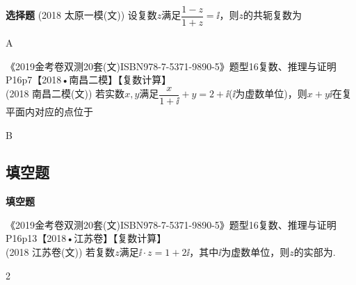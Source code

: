 \begin{exercise}{\bf 选择题}
        {\kaishu (2018 \textbullet 太原一模(文))}
        设复数$z$满足$\dfrac{1-z}{1+z}=\ii$，则$z$的共轭复数为\xz
        \xx{$\ii$}{$-\ii$}{$2\ii$}{$-2\ii$}
        \begin{answer}
          A
        \end{answer}
    \item 《2019金考卷双测20套(文)ISBN978-7-5371-9890-5》题型16复数、推理与证明P16p7【2018•南昌二模】【复数计算】\\
        {\kaishu (2018 \textbullet 南昌二模(文))}
        若实数$x,y$满足$\dfrac{x}{1+\ii}+y=2+\ii$($\ii$为虚数单位)，则$x+y\ii$在复平面内对应的点位于\xz
        \begin{answer}
          B
        \end{answer}
    \end{exercise}
  \subsection{填空题}\begin{exercise}{\bf 填空题}
    \item 《2019金考卷双测20套(文)ISBN978-7-5371-9890-5》题型16复数、推理与证明P16p13【2018•江苏卷】【复数计算】\\
      {\kaishu (2018 \textbullet 江苏卷(文))}
      若复数$z$满足$\ii\cdot z=1+2\ii$，其中$\ii$为虚数单位，则$z$的实部为\tk.
      \begin{answer}
        2
      \end{answer}
    \end{exercise}
